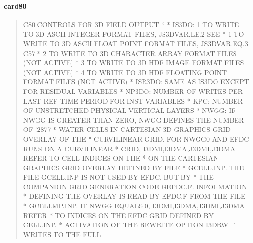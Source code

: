 \documentclass[letterpaper,10pt,english]{sphinxmanual}
\begin{document}
\paragraph{card80}
\label{\detokenize{inputfiles/runcontrol/card80:card80}}\label{\detokenize{inputfiles/runcontrol/card80::doc}}\begin{quote}

\begin{sphinxVerbatim}[commandchars=\\\{\}]
\PYGZhy{}\PYGZhy{}\PYGZhy{}\PYGZhy{}\PYGZhy{}\PYGZhy{}\PYGZhy{}\PYGZhy{}\PYGZhy{}\PYGZhy{}\PYGZhy{}\PYGZhy{}\PYGZhy{}\PYGZhy{}\PYGZhy{}\PYGZhy{}\PYGZhy{}\PYGZhy{}\PYGZhy{}\PYGZhy{}\PYGZhy{}\PYGZhy{}\PYGZhy{}\PYGZhy{}\PYGZhy{}\PYGZhy{}\PYGZhy{}\PYGZhy{}\PYGZhy{}\PYGZhy{}\PYGZhy{}\PYGZhy{}\PYGZhy{}\PYGZhy{}\PYGZhy{}\PYGZhy{}\PYGZhy{}\PYGZhy{}\PYGZhy{}\PYGZhy{}\PYGZhy{}\PYGZhy{}\PYGZhy{}\PYGZhy{}\PYGZhy{}\PYGZhy{}\PYGZhy{}\PYGZhy{}\PYGZhy{}\PYGZhy{}\PYGZhy{}\PYGZhy{}\PYGZhy{}\PYGZhy{}\PYGZhy{}\PYGZhy{}\PYGZhy{}\PYGZhy{}\PYGZhy{}\PYGZhy{}\PYGZhy{}\PYGZhy{}\PYGZhy{}\PYGZhy{}\PYGZhy{}\PYGZhy{}\PYGZhy{}\PYGZhy{}\PYGZhy{}\PYGZhy{}\PYGZhy{}\PYGZhy{}\PYGZhy{}\PYGZhy{}\PYGZhy{}\PYGZhy{}\PYGZhy{}\PYGZhy{}
C80 CONTROLS FOR 3D FIELD OUTPUT
*
*  IS3DO:  1 TO WRITE TO 3D ASCII INTEGER FORMAT FILES, JS3DVAR.LE.2     SEE\textbar{}
*          1 TO WRITE TO 3D ASCII FLOAT POINT FORMAT FILES, JS3DVAR.EQ.3 C57\textbar{}
*          2 TO WRITE TO 3D CHARACTER ARRAY FORMAT FILES (NOT ACTIVE)
*          3 TO WRITE TO 3D HDF IMAGE FORMAT FILES (NOT ACTIVE)
*          4 TO WRITE TO 3D HDF FLOATING POINT FORMAT FILES (NOT ACTIVE)
*  ISR3DO:   SAME AS IS3DO EXCEPT FOR RESIDUAL VARIABLES
*  NP3DO:    NUMBER OF WRITES PER LAST REF TIME PERIOD FOR INST VARIABLES
*  KPC:      NUMBER OF UNSTRETCHED PHYSICAL VERTICAL LAYERS
*  NWGG:     IF NWGG IS GREATER THAN ZERO, NWGG DEFINES THE NUMBER OF !2877\textbar{}
*            WATER CELLS IN CARTESIAN 3D GRAPHICS GRID OVERLAY OF THE
*            CURVILINEAR GRID. FOR NWGG\PYGZgt{}0 AND EFDC RUNS ON A CURVILINEAR
*            GRID, I3DMI,I3DMA,J3DMI,J3DMA REFER TO CELL INDICES ON THE
*            ON THE CARTESIAN GRAPHICS GRID OVERLAY DEFINED BY FILE
*            GCELL.INP.  THE FILE GCELL.INP IS NOT USED BY EFDC, BUT BY
*            THE COMPANION GRID GENERATION CODE GEFDC.F.  INFORMATION
*            DEFINING THE OVERLAY IS READ BY EFDC.F FROM THE FILE
*            GCELLMP.INP. IF NWGG EQUALS 0, I3DMI,I3DMA,J3DMI,J3DMA REFER
*            TO INDICES ON THE EFDC GRID DEFINED BY CELL.INP.
*            ACTIVATION OF THE REWRITE OPTION I3DRW=1 WRITES TO THE FULL

\end{sphinxVerbatim}
\end{quote}
\end{document}
